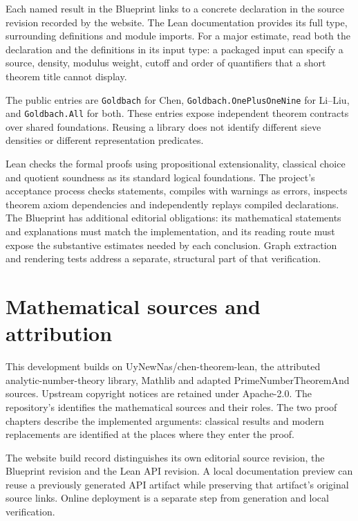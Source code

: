 Each named result in the Blueprint links to a concrete declaration in the
source revision recorded by the website. The Lean documentation provides
its full type, surrounding definitions and module imports. For a major
estimate, read both the declaration and the definitions in its input type:
a packaged input can specify a source, density, modulus weight, cutoff and
order of quantifiers that a short theorem title cannot display.

The public entries are \texttt{Goldbach} for Chen,
\texttt{Goldbach.OnePlusOneNine} for Li--Liu, and \texttt{Goldbach.All} for
both. These entries expose independent theorem contracts over shared
foundations. Reusing a library does not identify different sieve densities
or different representation predicates.

Lean checks the formal proofs using propositional extensionality, classical
choice and quotient soundness as its standard logical foundations. The
project's acceptance process checks statements, compiles with warnings as
errors, inspects theorem axiom dependencies and independently replays
compiled declarations. The Blueprint has additional editorial obligations:
its mathematical statements and explanations must match the implementation,
and its reading route must expose the substantive estimates needed by each
conclusion. Graph extraction and rendering tests address a separate,
structural part of that verification.

\section{Mathematical sources and attribution}

This development builds on UyNewNas/chen-theorem-lean, the attributed
analytic-number-theory library, Mathlib and adapted
PrimeNumberTheoremAnd sources. Upstream copyright notices are retained
under Apache-2.0. The repository's  identifies the mathematical sources and their roles. The two proof chapters describe the
implemented arguments: classical results and modern replacements are
identified at the places where they enter the proof.

The website build record distinguishes its own editorial source revision,
the Blueprint revision and the Lean API revision. A local documentation
preview can reuse a previously generated API artifact while preserving
that artifact's original source links. Online deployment is a separate
step from generation and local verification.

